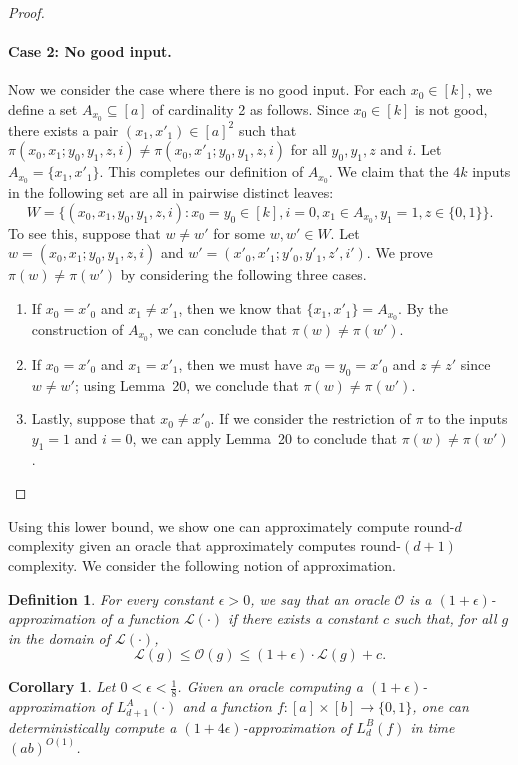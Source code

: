 \documentclass[10pt,a4paper]{article}
\newtheorem{definition}[theorem]{Definition}
\newtheorem{corollary}[theorem]{Corollary}
\begin{document}
\begin{proof}
\paragraph{Case 2: No good input.} Now we consider the case where there is no good input. For each $x_0\in[k]$, we define a set $A_{x_0}\subseteq[a]$ of cardinality 2 as follows. Since $x_0\in[k]$ is not good, there exists a pair $(x_1,x'_1)\in[a]^2$ such that $\pi(x_0,x_1;y_0,y_1,z,i)\ne\pi(x_0,x'_1;y_0,y_1,z,i)$ for all $y_0,y_1,z$ and $i$. Let $A_{x_0}=\{x_1,x'_1\}$. This completes our definition of $A_{x_0}$.
We claim that the $4k$ inputs in the following set are all in pairwise distinct leaves:
\[W=\{(x_0,x_1,y_0,y_1,z,i):x_0=y_0\in[k],i=0,x_1\in A_{x_0},y_1=1,z\in\{0,1\}\}.\]
To see this, suppose that $w\ne w'$ for some $w,w'\in W$. Let $w=(x_0,x_1;y_0,y_1,z,i)$ and $w'=(x'_0,x'_1;y'_0,y'_1,z',i')$. We prove $\pi(w)\ne\pi(w')$ by considering the following three cases.
\begin{enumerate}
\item If $x_0=x'_0$ and $x_1\ne x'_1$, then we know that $\{x_1,x'_1\}=A_{x_0}$. By the construction of $A_{x_0}$, we can conclude that $\pi(w)\ne\pi(w')$.
\item If $x_0=x'_0$ and $x_1=x'_1$, then we must have $x_0=y_0=x'_0$ and $z\ne z'$ since $w\ne w'$; using Lemma~20, we conclude that $\pi(w)\ne\pi(w')$.
\item Lastly, suppose that $x_0\ne x'_0$. If we consider the restriction of $\pi$ to the inputs $y_1=1$ and $i=0$, we can apply Lemma~20 to conclude that $\pi(w)\ne\pi(w')$.
\end{enumerate}
\end{proof}
Using this lower bound, we show one can approximately compute round-$d$ complexity given an oracle that approximately computes round-$(d+1)$ complexity. We consider the following notion of approximation.
\begin{definition}
For every constant $\epsilon>0$, we say that an oracle $\mathcal O$ is a $(1+\epsilon)$-approximation of a function $\mathcal L(\cdot)$ if there exists a constant $c$ such that, for all $g$ in the domain of $\mathcal L(\cdot)$,
\[\mathcal L(g)\le\mathcal O(g)\le(1+\epsilon)\cdot\mathcal L(g)+c.\]
\end{definition}
\begin{corollary}\label{cor:approx-elimination}
Let $0<\epsilon<\frac18$. Given an oracle computing a $(1+\epsilon)$-approximation of $L_{d+1}^A(\cdot)$ and a function $f:[a]\times[b]\to\{0,1\}$, one can deterministically compute a $(1+4\epsilon)$-approximation of $L_d^B(f)$ in time $(ab)^{O(1)}$.
\end{corollary}
\end{document}
